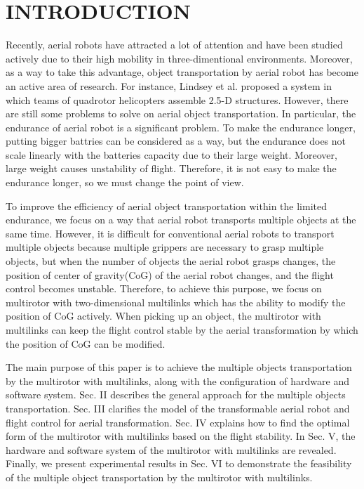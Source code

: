 \section{INTRODUCTION}
Recently, aerial robots have attracted a lot of attention and have been studied actively due to their high mobility in three-dimentional environments\cite{Kumar2012}. Moreover, as a way to take this advantage,  object transportation by aerial robot has become an active area of research. For instance, Lindsey et al.\cite{Lindsey2012} proposed a system in which teams of quadrotor helicopters assemble 2.5-D structures. However, there are still some problems to solve on aerial object transportation. In particular, the endurance of aerial robot is a significant problem. To make the endurance longer, putting bigger battries can be considered as a way, but the endurance does not scale linearly with the batteries capacity due to their large weight. Moreover, large weight causes unstability of flight. Therefore, it is not easy to make the endurance longer, so we must change the point of view. 
\par
To improve the efficiency of aerial object transportation within the limited endurance, we focus on a way that aerial robot transports multiple objects at the same time. However, it is difficult for conventional aerial robots to transport multiple objects because multiple grippers are necessary to grasp multiple objects, but when the number of objects the aerial robot grasps changes, the position of center of gravity(CoG) of the aerial robot changes, and the flight control becomes unstable. Therefore, to achieve this purpose, we focus on multirotor with two-dimensional multilinks\cite{Zhao2016} which has the ability to modify the position of CoG actively. When picking up an object, the multirotor with multilinks can keep the flight control stable by the aerial transformation by which the position of CoG can be modified. 
\par
The main purpose of this paper is to achieve the multiple objects transportation by the multirotor with multilinks, along with the configuration of hardware and software system. Sec. II describes the general approach for the multiple objects transportation. Sec. III clarifies the model of the transformable aerial robot and flight control for aerial transformation.  Sec. IV explains how to find the optimal form of the multirotor with multilinks based on the flight stability. In Sec. V, the hardware and software system of the multirotor with multilinks are revealed. Finally, we present experimental results in Sec. VI to demonstrate the feasibility of the multiple object transportation by the multirotor with multilinks. 
